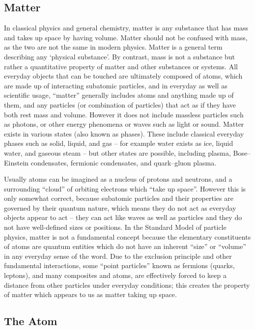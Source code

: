 \documentclass[
]{article}
\begin{document}
\hypertarget{matter}{%
\subsection{Matter}\label{matter}}

In classical physics and general chemistry, matter is any substance that
has mass and takes up space by having volume. Matter should not be
confused with mass, as the two are not the same in modern physics.
Matter is a general term describing any `physical substance'. By
contrast, mass is not a substance but rather a quantitative property of
matter and other substances or systems. All everyday objects that can be
touched are ultimately composed of atoms, which are made up of
interacting subatomic particles, and in everyday as well as scientific
usage, ``matter'' generally includes atoms and anything made up of them,
and any particles (or combination of particles) that act as if they have
both rest mass and volume. However it does not include massless
particles such as photons, or other energy phenomena or waves such as
light or sound. Matter exists in various states (also known as phases).
These include classical everyday phases such as solid, liquid, and gas
-- for example water exists as ice, liquid water, and gaseous steam --
but other states are possible, including plasma, Bose--Einstein
condensates, fermionic condensates, and quark--gluon plasma.

Usually atoms can be imagined as a nucleus of protons and neutrons, and
a surrounding ``cloud'' of orbiting electrons which ``take up space''.
However this is only somewhat correct, because subatomic particles and
their properties are governed by their quantum nature, which means they
do not act as everyday objects appear to act -- they can act like waves
as well as particles and they do not have well-defined sizes or
positions. In the Standard Model of particle physics, matter is not a
fundamental concept because the elementary constituents of atoms are
quantum entities which do not have an inherent ``size'' or ``volume'' in
any everyday sense of the word. Due to the exclusion principle and other
fundamental interactions, some ``point particles'' known as fermions
(quarks, leptons), and many composites and atoms, are effectively forced
to keep a distance from other particles under everyday conditions; this
creates the property of matter which appears to us as matter taking up
space.

\hypertarget{the-atom}{%
\subsection{The Atom}\label{the-atom}}
\end{document}
